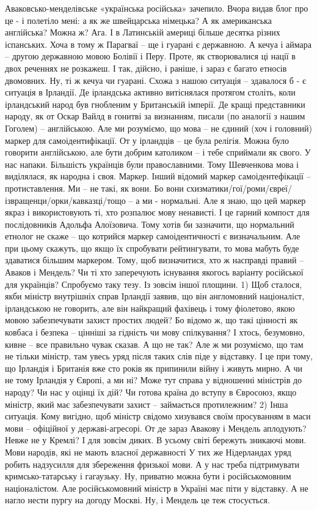 Аваковсько-менделівське «українська російська» зачепило.
Вчора видав блог про це - і полетіло мені: а як же швейцарська німецька? А як американська англійська? Можна ж?
Ага. І в Латинській америці більше десятка різних іспанських.
Хоча в тому ж Парагваї – ще і гуарані є державною. А кечуа і аймара – другою державною мовою Болівії і Перу.
Проте, як створювалися ці нації в двох реченнях не розкажеш.
І так, дійсно, і раніше, і зараз є багато етносів двомовних. Ну, ті ж кечуа чи гуарані.
Схожа з нашою ситуація – здавалося б - є ситуація в Ірландії.
Де ірландська активно витіснялася протягом століть, коли ірландський народ був гнобленим у Британській імперії.
Де кращі представники народу, як от Оскар Вайлд в гонитві за визнанням, писали (по аналогії з нашим Гоголем) – англійською.
Але ми розуміємо, що мова – не єдиний (хоч і головний) маркер для самоідентифікації.
От у ірландців – це була релігія. Можна було говорити англійською, але бути добрим католиком – і тебе сприймали як свого.
У нас напаки. Більшість українців були православними.
Тому Шевченкова мова і виділялася, як народна і своя. Маркер.
Інший відомий маркер самоідентефікації – протиставлення. Ми – не такі, як вони. Бо вони схизматики/гої/роми/євреї/ізвращенци/орки/кавказці/тощо – а ми - нормальні.
Але я знаю, що цей маркер якраз і використовують ті, хто розпалює мову ненависті. І це гарний компост для послідовників Адольфа Алоїзовича.
Тому хотів би зазначити, що нормальний етнолог не скаже – що котрийся маркер самоідентичності є визначальним. Але при цьому скажуть, що якщо їх спробувати рейтингувати, то мова мабуть буде здаватися більшим маркером.
Тому, щоб визначитися, хто ж насправді правий – Аваков і Мендель? Чи ті хто заперечують існування якогось варіанту російської для українців?
Спробуємо таку тезу. Із зовсім іншої площини.
1) Щоб сталося, якби міністр внутрішніх справ Ірландії заявив, що він англомовний націоналіст, ірландською не говорить, але він найкращий фахівець і тому фіолетово, якою мовою забезпечувати захист простих людей? Бо відомо ж, що такі цінності як ковбаса і безпека – цінніші за гідність чи мову спілкування? 
І хтось, безумовно, кивне – все правильно чувак сказав. А що не так?
Але ж ми розуміємо, що там не тільки міністр, там увесь уряд після таких слів піде у відставку. І це при тому, що Ірландія і Британія вже сто років як припинили війну і живуть мирно.
А чи не тому Ірландія у Європі, а ми ні? Може тут справа у відношенні міністрів до народу? Чи нас у оцінці їх дій? Чи готова країна до вступу в Євросоюз, якщо міністр, який має забезпечувати захист – займається протилежним?
2) Інша ситуація. Кому вигідно, щоб міністр свідомо хизувався своїм просуванням в маси мови – офіційної у державі-агресорі.
От де зараз Авакову і Мендель аплодують? Невже не у Кремлі?
І для зовсім диких. В усьому світі бережуть зникаючі мови. Мови народів, які не мають власної державності
У тих же Нідерландах уряд робить надзусилля для збереження фризької мови. 
А у нас треба підтримувати кримсько-татарську і гагаузьку.
Ну, приватно можна бути і російськомовним націоналістом.
Але російськомовний міністр в Україні має піти у відставку.
А не нагло нести пургу на догоду Москві.
Ну, і Мендель це теж стосується.

